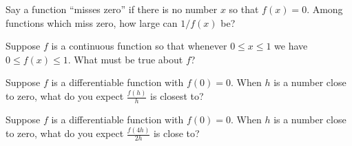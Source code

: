 \documentclass{ximera}
\begin{document}
\begin{problem}
  Say a function ``misses zero'' if there is no number $x$ so that
  $f(x) = 0$.  Among functions which miss zero, how large can $1/f(x)$
  be?
  \begin{multipleChoice}
  \end{multipleChoice}
\end{problem}

\begin{problem}
  Suppose $f$ is a continuous function so that whenever $0 \leq x \leq 1$ we have $0 \leq f(x) \leq 1$.  What must be true about $f$?
  \begin{multipleChoice}
  \end{multipleChoice}
\end{problem}



\begin{problem}
  Suppose $f$ is a differentiable function with $f(0) = 0$.  When $h$
  is a number close to zero, what do you expect $\frac{f(h)}{h}$ is
  closest to?
  \begin{multipleChoice}
  \end{multipleChoice}
\end{problem}

\begin{problem}
  Suppose $f$ is a differentiable function with $f(0)=0$.  When $h$ is
  a number close to zero, what do you expect $\frac{f(4h)}{2h}$ is
  close to?
  \begin{multipleChoice}
  \end{multipleChoice}
\end{problem}
\end{document}
